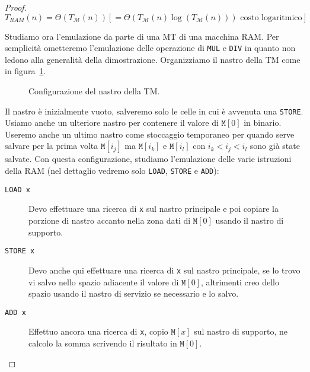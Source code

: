 \documentclass[a4paper,11pt,oneside]{article}
\theoremstyle{plain}
\theoremstyle{definition}
\theoremstyle{remark}
\begin{document}
\begin{proof}
  \[
    T_{RAM}(n) = \Theta(T_\mathcal{M}(n))
      [ = \Theta(T_\mathcal{M}(n)\log(T_\mathcal{M}(n))) \text{ costo logaritmico} ]
  \]

  Studiamo ora l'emulazione da parte di una MT di una macchina RAM\@. Per
  semplicità ometteremo l'emulazione delle operazione di \texttt{MUL} e
  \texttt{DIV} in quanto non ledono alla generalità della dimostrazione.
  Organizziamo il nastro della TM come in figura~\ref{fig:thm-corr-tm-ram}.

  \begin{figure}[htb]
    \centering
    \caption{Configurazione del nastro della TM\@.}%
    \label{fig:thm-corr-tm-ram}
  \end{figure}

  Il nastro è inizialmente vuoto, salveremo solo le celle in cui è avvenuta una
  \texttt{STORE}. Usiamo anche un ulteriore nastro per contenere il valore di
  $\mathtt{M}[0]$ in binario. Useremo anche un ultimo nastro come stoccaggio
  temporaneo per quando serve salvare per la prima volta $\mathtt{M}[i_j]$ ma
  $\mathtt{M}[i_k]$ e $\mathtt{M}[i_l]$ con $i_k < i_j < i_l$ sono già state
  salvate. Con questa configurazione, studiamo l'emulazione delle varie
  istruzioni della RAM (nel dettaglio vedremo solo \texttt{LOAD}, \texttt{STORE}
  e \texttt{ADD}):

  \begin{description}
    \item[\texttt{LOAD x}] Devo effettuare una ricerca di \texttt{x} sul nastro
      principale e poi copiare la porzione di nastro accanto nella zona dati di
      $\mathtt{M}[0]$ usando il nastro di supporto.
    \item[\texttt{STORE x}] Devo anche qui effettuare una ricerca di \texttt{x}
      sul nastro principale, se lo trovo vi salvo nello spazio adiacente il
      valore di $\mathtt{M}[0]$, altrimenti creo dello spazio usando il nastro
      di servizio se necessario e lo salvo.
    \item[\texttt{ADD x}] Effettuo ancora una ricerca di \texttt{x}, copio
      $\mathtt{M}[x]$ sul nastro di supporto, ne calcolo la somma scrivendo il
      risultato in $\mathtt{M}[0]$.
  \end{description}


\end{proof}
\end{document}

